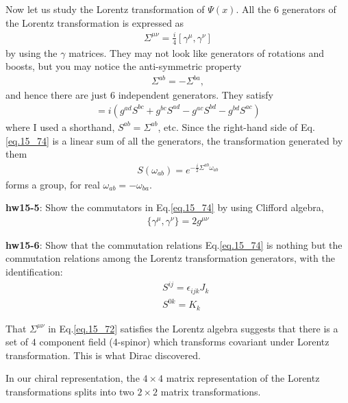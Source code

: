 \documentclass[12pt]{article}
\begin{document}
{  Now let us study the Lorentz transformation of $\Psi(x)$. All the $6$
  generators of the Lorentz transformation is expressed as
\begin{eqnarray}
  \Sigma^{\mu\nu} = \frac{i}{4} [ \gamma^\mu, \gamma^\nu ] \label{eq.15_72}
\end{eqnarray}
  by using the $\gamma$ matrices. They may not look like generators of
  rotations and boosts, but you may notice the anti-symmetric property
\begin{eqnarray}
  \Sigma^{ab} = -\Sigma^{ba}, \label{eq.15_73}
\end{eqnarray}
  and hence there are just 6 independent generators. They satisfy
\begin{eqnarray}
  [S^{ab}, S^{cd}] = i( g^{ad} S^{bc} + g^{bc} S^{ad} - g^{ac} S^{bd} - g^{bd} S^{ac}) \label{eq.15_74}
\end{eqnarray}
  where I used a shorthand, $S^{ab} = \Sigma^{ab}$, etc. Since the right-hand
  side of Eq.\ref{eq.15_74} is a linear sum of all the generators, the transformation generated by them
\begin{eqnarray}
  S(\omega_{ab}) = e^{ -\frac{i}{2} \Sigma^{ab} \omega_{ab} } \label{eq.15_75}
\end{eqnarray}
  forms a group, for real $\omega _{ab}=-\omega_{ba}$.

{\bf hw15-5}: Show the commutators in Eq.\ref{eq.15_74} by using Clifford algebra,
\begin{eqnarray}
  \{ \gamma^\mu, \gamma^\nu \} = 2g^{\mu\nu} \label{eq.15_76}
\end{eqnarray}

{\bf hw15-6}: Show that the commutation relations Eq.\ref{eq.15_74} is nothing but the commutation relations among the Lorentz transformation generators,
with the identification:
\begin{eqnarray}
  && S^{ij} = \epsilon_{ijk} J_k \label{eq.15_77a}\\
  && S^{0k} = K_k \label{eq.15_77b}
\end{eqnarray}

 That $\Sigma^{\mu\nu}$ in Eq.\ref{eq.15_72} satisfies the Lorentz algebra 
 suggests that there is a set of $4$ component field (4-spinor) which transforms covariant under Lorentz transformation.  This is what Dirac discovered.

  In our chiral representation, the $4\times 4$ matrix representation of the
  Lorentz transformations splits into two $2\times 2$ matrix transformations.

}
\end{document}
